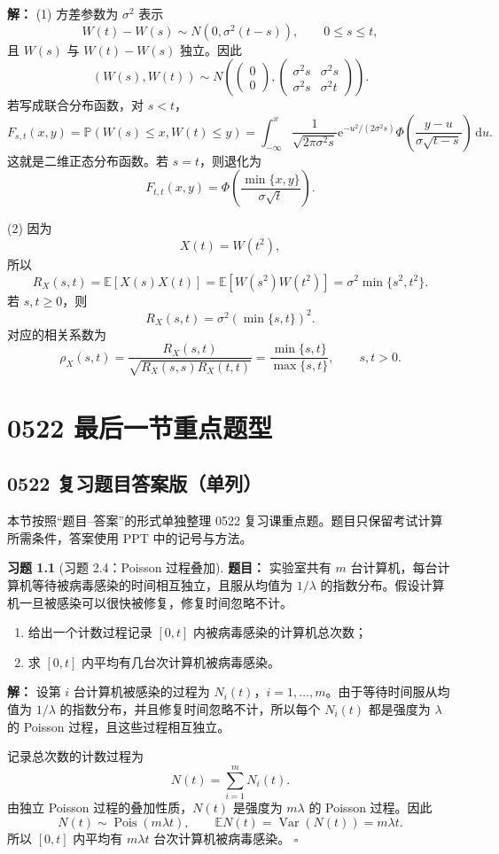 \documentclass[12pt,a4paper,openany]{ctexrep}
\theoremstyle{definition}
\newtheorem{exercise}{习题}[section]
\newenvironment{solution}{\par\noindent\textbf{解：}}{\hfill$\square$\par}
\newcommand{\E}{\mathbb{E}}
\newcommand{\Var}{\operatorname{Var}}
\newcommand{\Pp}{\mathbb{P}}
\newcommand{\Pois}{\operatorname{Pois}}
\newcommand{\dd}{\,\mathrm{d}}
\newcommand{\e}{\mathrm{e}}
\begin{document}
\begin{enumerate}[label=\textbf{题 \arabic*:}]
	\textbf{解：}
	(1) 方差参数为 $\sigma^2$ 表示
	\[
	W(t)-W(s)\sim N(0,\sigma^2(t-s)),\qquad 0\le s\le t,
	\]
	且 $W(s)$ 与 $W(t)-W(s)$ 独立。因此
	\[
	(W(s),W(t))
	\sim
	N\left(
	\begin{pmatrix}0\\0\end{pmatrix},
	\begin{pmatrix}
	\sigma^2s&\sigma^2s\\
	\sigma^2s&\sigma^2t
	\end{pmatrix}
	\right).
	\]
	若写成联合分布函数，对 $s<t$，
	\[
	F_{s,t}(x,y)
	=
	\Pp(W(s)\le x,W(t)\le y)
	=
	\int_{-\infty}^{x}
	\frac1{\sqrt{2\pi\sigma^2s}}
	\e^{-u^2/(2\sigma^2s)}
	\Phi\left(\frac{y-u}{\sigma\sqrt{t-s}}\right)
	\dd u.
	\]
	这就是二维正态分布函数。若 $s=t$，则退化为
	\[
	F_{t,t}(x,y)=\Phi\left(\frac{\min\{x,y\}}{\sigma\sqrt t}\right).
	\]

	(2) 因为
	\[
	X(t)=W(t^2),
	\]
	所以
	\[
	R_X(s,t)=\E[X(s)X(t)]
	=\E[W(s^2)W(t^2)]
	=\sigma^2\min\{s^2,t^2\}.
	\]
	若 $s,t\ge0$，则
	\[
	\boxed{R_X(s,t)=\sigma^2(\min\{s,t\})^2.}
	\]
	对应的相关系数为
	\[
	\rho_X(s,t)=\frac{R_X(s,t)}{\sqrt{R_X(s,s)R_X(t,t)}}
	=\frac{\min\{s,t\}}{\max\{s,t\}},\qquad s,t>0.
	\]
\end{enumerate}

\chapter{0522 最后一节重点题型}

\section{0522 复习题目答案版（单列）}

本节按照“题目--答案”的形式单独整理 0522 复习课重点题。题目只保留考试计算所需条件，答案使用 PPT 中的记号与方法。

\begin{exercise}[习题 2.4：Poisson 过程叠加]
\textbf{题目：}
实验室共有 $m$ 台计算机，每台计算机等待被病毒感染的时间相互独立，且服从均值为 $1/\lambda$ 的指数分布。假设计算机一旦被感染可以很快被修复，修复时间忽略不计。
\begin{enumerate}[label=(\alph*)]
	\item 给出一个计数过程记录 $[0,t]$ 内被病毒感染的计算机总次数；
	\item 求 $[0,t]$ 内平均有几台次计算机被病毒感染。
\end{enumerate}
\end{exercise}
\begin{solution}
设第 $i$ 台计算机被感染的过程为 $N_i(t)$，$i=1,\dots,m$。由于等待时间服从均值为 $1/\lambda$ 的指数分布，并且修复时间忽略不计，所以每个 $N_i(t)$ 都是强度为 $\lambda$ 的 Poisson 过程，且这些过程相互独立。

记录总次数的计数过程为
\[
N(t)=\sum_{i=1}^mN_i(t).
\]
由独立 Poisson 过程的叠加性质，$N(t)$ 是强度为 $m\lambda$ 的 Poisson 过程。因此
\[
N(t)\sim\Pois(m\lambda t),\qquad
\E N(t)=\Var(N(t))=m\lambda t.
\]
所以 $[0,t]$ 内平均有 $m\lambda t$ 台次计算机被病毒感染。
\end{solution}
\end{document}
